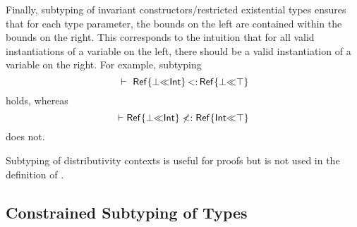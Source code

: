 Finally, subtyping of invariant constructors/restricted existential types
ensures that for each type parameter, the bounds on the left are contained
within the bounds on the right. This corresponds to the intuition that
for all valid instantiations of a variable on the left, there should be
a valid instantiation of a variable on the right.
For example, subtyping
\[
    \ \vdash\ \mathsf{Ref}\{\bot{\operatorname{\ll}}\mathsf{Int}\} \operatorname{<:} \mathsf{Ref}\{\bot{\operatorname{\ll}}\top\}
\]
holds, whereas
\[
    \vdash \mathsf{Ref}\{\bot{\operatorname{\ll}}\mathsf{Int}\} \nless:
    \mathsf{Ref}\{\mathsf{Int}{\operatorname{\ll}}\top\}
\]
does not.

Subtyping of distributivity contexts  is 
useful for proofs but is not used in the definition of .

\subsection{Constrained Subtyping of Types}

